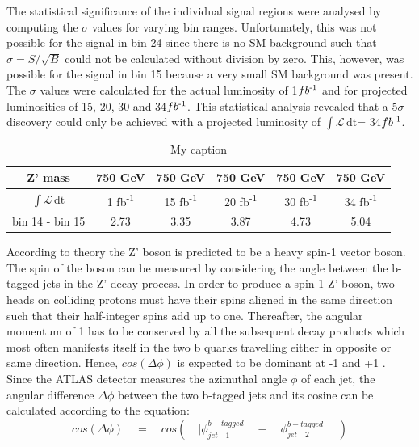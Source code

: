 \documentclass[runningheads,a4paper]{llncs}
\newcommand{\invfb}{fb\textsuperscript{-1}}
\newcommand{\lumi}{$\int \mathcal{L} \, \mathrm{dt}$}
\begin{document}
The statistical significance of the individual signal regions were analysed by computing the $\sigma$ values for varying bin ranges. Unfortunately, this was not possible for the signal in bin 24 since there is no SM background such that $\sigma = { S }/{ \sqrt { B }  }$ could not be calculated without division by zero. This, however, was possible for the signal in bin 15 because a very small SM background was present. The $\sigma$ values were calculated for the actual luminosity of 1$\invfb$ and for projected luminosities of 15, 20, 30 and 34$\invfb$. This statistical analysis revealed that a 5$\sigma$ discovery could only be achieved with a projected luminosity of \lumi = 34$\invfb$.

\begin{table}[h]
\centering
\caption{My caption}
\label{my-label}
\begin{tabular}{|c|c|c|c|c|c|}
\hline
Z' mass         & 750 GeV  & 750 GeV   & 750 GeV   & 750 GeV   & 750 GeV   \\ \hline
\lumi           & 1 \invfb & 15 \invfb & 20 \invfb & 30 \invfb & 34 \invfb \\ \hline
bin 14 - bin 15 & 2.73     & 3.35      & 3.87      & 4.73      & 5.04      \\ \hline
\end{tabular}
\end{table}


According to theory the Z' boson is predicted to be a heavy spin-1 vector boson. The spin of the boson can be measured by considering the angle between the b-tagged jets in the Z' decay process. In order to produce a spin-1 Z' boson, two heads on colliding protons must have their spins aligned in the same direction such that their half-integer spins add up to one. Thereafter, the angular momentum of 1 has to be conserved by all the subsequent decay products which most often manifests itself in the two b quarks travelling either in opposite or same direction. Hence, $cos(\Delta \phi)$ is expected to be dominant at -1 and +1 \cite{quantumdiaries}. Since the ATLAS detector measures the azimuthal angle $\phi$ of each jet, the angular difference $\Delta \phi$ between the two b-tagged jets and its cosine can be calculated according to the equation:\\

\begin{equation}
cos(\Delta \phi )\quad =\quad cos(\quad { { |\phi  }_{ jet\quad 1 }^{ b-tagged }\quad -\quad { \phi  }_{ jet\quad 2 }^{ b-tagged } }|\quad )
\end{equation}
\end{document}
